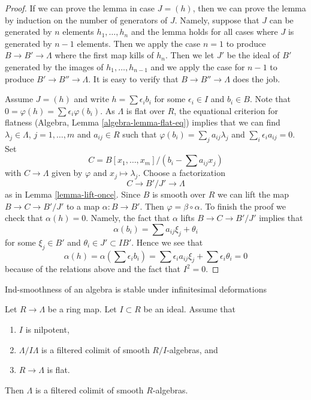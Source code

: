\begin{proof}
If we can prove the lemma in case $J = (h)$, then we can prove the
lemma by induction on the number of generators of $J$. Namely, suppose
that $J$ can be generated by $n$ elements $h_1, \ldots, h_n$ and the
lemma holds for all cases where $J$ is generated by $n - 1$ elements.
Then we apply the case $n = 1$ to produce $B \to B' \to \Lambda$
where the first map kills of $h_n$. Then we let $J'$ be the
ideal of $B'$ generated by the images of $h_1, \ldots, h_{n - 1}$
and we apply the case for $n - 1$ to produce $B' \to B'' \to \Lambda$.
It is easy to verify that $B \to B'' \to \Lambda$ does the job.

\medskip\noindent
Assume $J = (h)$ and write $h = \sum \epsilon_i b_i$
for some $\epsilon_i \in I$ and $b_i \in B$. Note that
$0 = \varphi(h) = \sum \epsilon_i \varphi(b_i)$.
As $\Lambda$ is flat over $R$, the equational criterion for
flatness (Algebra, Lemma \ref{algebra-lemma-flat-eq})
implies that we can find $\lambda_j \in \Lambda$,
$j = 1, \ldots, m$ and $a_{ij} \in R$ such that
$\varphi(b_i) = \sum_j a_{ij} \lambda_j$ and $\sum_i \epsilon_i a_{ij} = 0$.
Set
$$
C = B[x_1, \ldots, x_m]/(b_i - \sum a_{ij} x_j)
$$
with $C \to \Lambda$ given by $\varphi$ and $x_j \mapsto \lambda_j$.
Choose a factorization
$$
C \to B'/J' \to \Lambda
$$
as in Lemma \ref{lemma-lift-once}. Since $B$ is smooth over $R$ we can
lift the map $B \to C \to B'/J'$ to a map $\alpha : B \to B'$. Then
$\varphi = \beta \circ \alpha$. To finish the proof we check that
$\alpha(h) = 0$. Namely, the fact that $\alpha$ lifts
$B \to C \to B'/J'$ implies that
$$
\alpha(b_i) = \sum a_{ij} \xi_j + \theta_i
$$
for some $\xi_j \in B'$ and $\theta_i \in J' \subset IB'$.
Hence we see that
$$
\alpha(h) = \alpha(\sum \epsilon_i b_i) =
\sum \epsilon_i a_{ij} \xi_j + \sum \epsilon_i \theta_i = 0
$$
because of the relations above and the fact that $I^2 = 0$.
\end{proof}

\begin{proposition}
\label{proposition-lift}
\begin{slogan}
Ind-smoothness of an algebra is stable under infinitesimal deformations
\end{slogan}
Let $R \to \Lambda$ be a ring map. Let $I \subset R$ be an ideal.
Assume that
\begin{enumerate}
\item $I$ is nilpotent,
\item $\Lambda/I\Lambda$ is a filtered colimit of smooth $R/I$-algebras, and
\item $R \to \Lambda$ is flat.
\end{enumerate}
Then $\Lambda$ is a filtered colimit of smooth $R$-algebras.
\end{proposition}

